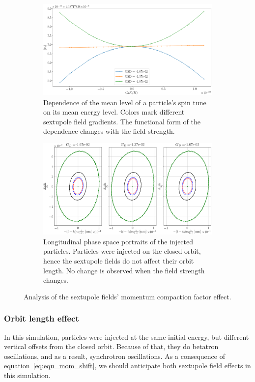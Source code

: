\documentclass[]{elsarticle}
\begin{document}
\begin{figure}[h]\centering
  \begin{subfigure}{\linewidth}
    \includegraphics[width=\linewidth]{img/decoh/STDK_3SS_D}
    \caption{Dependence of the mean level of a particle's spin tune on its mean energy level.
      Colors mark different sextupole field gradients.
      The functional form of the dependence changes with the field strength.\label{fig:sext:MCM_effect}}
  \end{subfigure}
  \begin{subfigure}{\linewidth}
    \includegraphics[width=\linewidth]{img/decoh/LPS_3SS_D}
    \caption{Longitudinal phase space portraits of the injected particles.
      Particles were injected on the closed orbit, hence the sextupole fields do not affect their orbit length.
      No change is observed when the field strength changes.\label{fig:sext:MCM_effect:LPS}}
  \end{subfigure}
  \caption{Analysis of the sextupole fields' momentum compaction factor effect.}
\end{figure}

\subsubsection{Orbit length effect}
In this simulation, particles were injected at the same initial energy, but different vertical offsets
from the closed orbit. Because of that, they do betatron oscillations, and as a result, synchrotron oscillations.
As a consequence of equation~\eqref{eq:equ_mom_shift}, we should anticipate both sextupole field effects
in this simulation.
\end{document}
